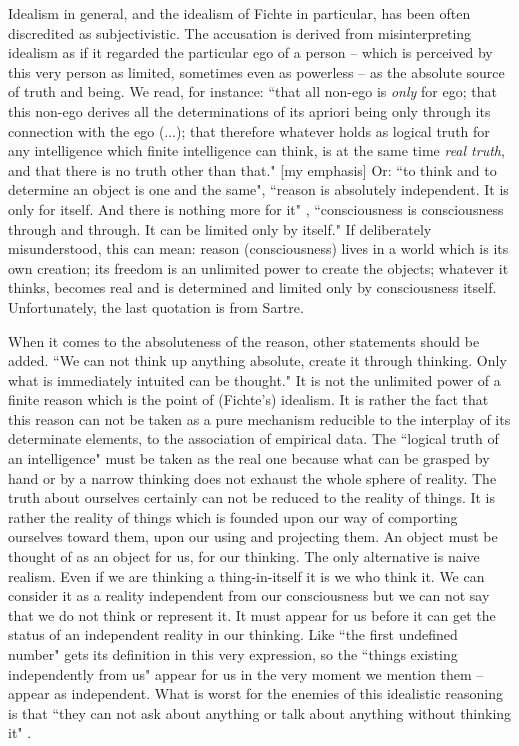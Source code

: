 Idealism in general, and the idealism of Fichte in particular, has been often discredited 
as subjectivistic. The 
accusation is derived from misinterpreting idealism as if it regarded the particular ego of a person -- which is perceived 
by this very person as limited, sometimes even as powerless -- as the absolute source of truth and being. We 
read, for instance: ``that all non-ego is {\em only} for ego; that this non-ego derives all the determinations of its apriori 
being only through its connection with the ego (...); that therefore whatever holds as logical truth for any 
intelligence which finite intelligence can think, is at the same time {\em real truth}, and that there is no truth other than 
that." \cite{RoA}  [my emphasis]  Or: ``to think and to determine an object is one and the same", ``reason is absolutely 
independent. It is only for itself. And there is nothing more for it" \cite{ITS}, ``consciousness is consciousness through and 
through. It can be limited only by itself." \cite{BN}  If deliberately misunderstood, this can mean: reason (consciousness) 
lives in a world which is its own creation; its freedom is an unlimited power to create the objects; whatever it 
thinks, becomes real and is determined and limited only by consciousness itself. Unfortunately, the last quotation 
is from Sartre.

When it comes to the absoluteness of the reason, other statements should be added. ``We can not think up 
anything absolute, create it through thinking. Only what is immediately intuited can be thought." \cite{ITS}  It is not the 
unlimited power of a finite reason which is the point of (Fichte's) idealism. It is rather the fact that this reason can not be 
taken as a pure mechanism reducible to the interplay of its determinate elements, to the association of empirical 
data. The ``logical truth of an intelligence" must be taken as the real one because what can be grasped by  hand or 
by a narrow thinking does not exhaust the whole sphere of reality. The truth about ourselves certainly can not be 
reduced to the reality of things. It is rather the reality of things which is founded upon our way of comporting 
ourselves toward them, upon our using and projecting them. An object must be thought of as an object for us, for our thinking. The only alternative is naive realism. 
Even if we are thinking a thing-in-itself it is we who think it. We can consider it as a reality independent from our consciousness but we can not say 
that we do not think or represent it. 
It must appear for us before it can get the status of an independent reality in our 
thinking. Like ``the first undefined number" gets its definition in this very expression, so the ``things existing 
independently from us" appear for us in the very moment we mention them -- appear as independent. What is worst 
for the enemies of this idealistic reasoning is that ``they can not ask about anything or talk about anything without thinking 
it" \cite{ITS}. 

